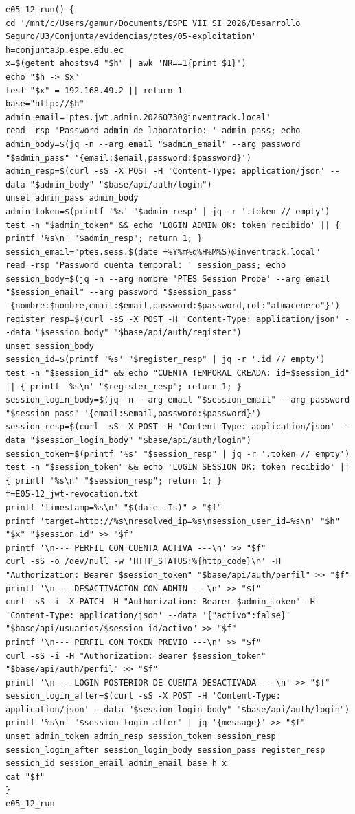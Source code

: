 \begin{tcolorbox}[codebox]
\begin{Verbatim}[fontsize=\scriptsize,breaklines=true,breakanywhere=true]
e05_12_run() {
cd '/mnt/c/Users/gamur/Documents/ESPE VII SI 2026/Desarrollo Seguro/U3/Conjunta/evidencias/ptes/05-exploitation'
h=conjunta3p.espe.edu.ec
x=$(getent ahostsv4 "$h" | awk 'NR==1{print $1}')
echo "$h -> $x"
test "$x" = 192.168.49.2 || return 1
base="http://$h"
admin_email='ptes.jwt.admin.20260730@inventrack.local'
read -rsp 'Password admin de laboratorio: ' admin_pass; echo
admin_body=$(jq -n --arg email "$admin_email" --arg password "$admin_pass" '{email:$email,password:$password}')
admin_resp=$(curl -sS -X POST -H 'Content-Type: application/json' --data "$admin_body" "$base/api/auth/login")
unset admin_pass admin_body
admin_token=$(printf '%s' "$admin_resp" | jq -r '.token // empty')
test -n "$admin_token" && echo 'LOGIN ADMIN OK: token recibido' || { printf '%s\n' "$admin_resp"; return 1; }
session_email="ptes.sess.$(date +%Y%m%d%H%M%S)@inventrack.local"
read -rsp 'Password cuenta temporal: ' session_pass; echo
session_body=$(jq -n --arg nombre 'PTES Session Probe' --arg email "$session_email" --arg password "$session_pass" '{nombre:$nombre,email:$email,password:$password,rol:"almacenero"}')
register_resp=$(curl -sS -X POST -H 'Content-Type: application/json' --data "$session_body" "$base/api/auth/register")
unset session_body
session_id=$(printf '%s' "$register_resp" | jq -r '.id // empty')
test -n "$session_id" && echo "CUENTA TEMPORAL CREADA: id=$session_id" || { printf '%s\n' "$register_resp"; return 1; }
session_login_body=$(jq -n --arg email "$session_email" --arg password "$session_pass" '{email:$email,password:$password}')
session_resp=$(curl -sS -X POST -H 'Content-Type: application/json' --data "$session_login_body" "$base/api/auth/login")
session_token=$(printf '%s' "$session_resp" | jq -r '.token // empty')
test -n "$session_token" && echo 'LOGIN SESSION OK: token recibido' || { printf '%s\n' "$session_resp"; return 1; }
f=E05-12_jwt-revocation.txt
printf 'timestamp=%s\n' "$(date -Is)" > "$f"
printf 'target=http://%s\nresolved_ip=%s\nsession_user_id=%s\n' "$h" "$x" "$session_id" >> "$f"
printf '\n--- PERFIL CON CUENTA ACTIVA ---\n' >> "$f"
curl -sS -o /dev/null -w 'HTTP_STATUS:%{http_code}\n' -H "Authorization: Bearer $session_token" "$base/api/auth/perfil" >> "$f"
printf '\n--- DESACTIVACION CON ADMIN ---\n' >> "$f"
curl -sS -i -X PATCH -H "Authorization: Bearer $admin_token" -H 'Content-Type: application/json' --data '{"activo":false}' "$base/api/usuarios/$session_id/activo" >> "$f"
printf '\n--- PERFIL CON TOKEN PREVIO ---\n' >> "$f"
curl -sS -i -H "Authorization: Bearer $session_token" "$base/api/auth/perfil" >> "$f"
printf '\n--- LOGIN POSTERIOR DE CUENTA DESACTIVADA ---\n' >> "$f"
session_login_after=$(curl -sS -X POST -H 'Content-Type: application/json' --data "$session_login_body" "$base/api/auth/login")
printf '%s\n' "$session_login_after" | jq '{message}' >> "$f"
unset admin_token admin_resp session_token session_resp session_login_after session_login_body session_pass register_resp session_id session_email admin_email base h x
cat "$f"
}
e05_12_run
\end{Verbatim}
\end{tcolorbox}

